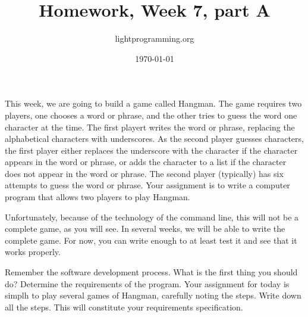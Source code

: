 \documentclass{article}
\title{Homework, Week 7, part A}
\author{lightprogramming.org}
\date{\today}
\begin{document}
\maketitle{}
\lstset{language=Lisp,numbers=left,keepspaces=false,basicstyle=\small,numberstyle=\tiny,breaklines=true,showstringspaces=false}

This week, we are going to build a game called Hangman. The game requires two players, one chooses a word or phrase, and the other tries to guess the word one character at the time. The first playert writes the word or phrase, replacing the alphabetical characters with underscores. As the second player guesses characters, the first player either replaces the underscore with the character if the character appears in the word or phrase, or adds the character to a list if the character does not appear in the word or phrase. The second player (typically) has six attempts to guess the word or phrase. Your assignment is to write a computer program that allows two players to play Hangman.

Unfortunately, because of the technology of the command line, this will not be a complete game, as you will see. In several weeks, we will be able to write the complete game. For now, you can write enough to at least test it and see that it works properly.

Remember the software development process. What is the first thing you should do? Determine the requirements of the program. Your assignment for today is simplh to play several games of Hangman, carefully noting the steps. Write down all the steps. This will constitute your requirements specification.
\end{document}
